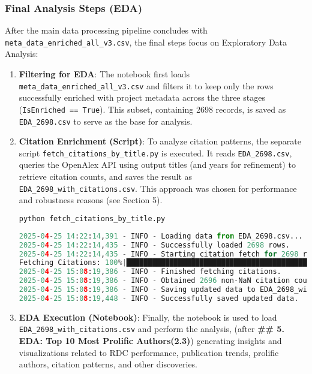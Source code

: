 \documentclass[12pt]{article}
\begin{document}
\subsubsection{Final Analysis Steps (EDA)}\label{final-analysis-steps-eda}

After the main data processing pipeline concludes with
\texttt{meta\_data\_enriched\_all\_v3.csv}, the final steps focus on
Exploratory Data Analysis:

\begin{enumerate}
\def\labelenumi{\arabic{enumi}.}
\item
  \textbf{Filtering for EDA}: The  notebook first
  loads \texttt{meta\_data\_enriched\_all\_v3.csv} and filters it to
  keep only the rows successfully enriched with project metadata across
  the three stages (\texttt{IsEnriched\ ==\ True}). This subset,
  containing 2698 records, is saved as \texttt{EDA\_2698.csv} to serve
  as the base for analysis.
\item
  \textbf{Citation Enrichment (Script)}: To analyze citation patterns,
  the separate script \texttt{fetch\_citations\_by\_title.py} is
  executed. It reads \texttt{EDA\_2698.csv}, queries the OpenAlex API
  using output titles (and years for refinement) to retrieve citation
  counts, and saves the result as
  \texttt{EDA\_2698\_with\_citations.csv}. This approach was chosen for
  performance and robustness reasons (see Section 5).

\begin{lstlisting}[language=Python]
python fetch_citations_by_title.py
\end{lstlisting}

\begin{lstlisting}[language=Python]
2025-04-25 14:22:14,391 - INFO - Loading data from EDA_2698.csv...
2025-04-25 14:22:14,435 - INFO - Successfully loaded 2698 rows.
2025-04-25 14:22:14,435 - INFO - Starting citation fetch for 2698 records using title search.
Fetching Citations: 100%|█████████████████████████████████████████████████████████████████████████████████████████████████████████████████████████| 2698/2698 [46:04<00:00,  1.02s/it]
2025-04-25 15:08:19,386 - INFO - Finished fetching citations.
2025-04-25 15:08:19,386 - INFO - Obtained 2696 non-NaN citation counts out of 2698 records.
2025-04-25 15:08:19,386 - INFO - Saving updated data to EDA_2698_with_citations.csv...
2025-04-25 15:08:19,448 - INFO - Successfully saved updated data.
\end{lstlisting}
\item
  \textbf{EDA Execution (Notebook)}: Finally, the 
  notebook is used to load \texttt{EDA\_2698\_with\_citations.csv} and
  perform the analysis, (after \textbf{\#\# 5. EDA: Top 10 Most Prolific
  Authors(2.3)}) generating insights and visualizations related to RDC
  performance, publication trends, prolific authors, citation patterns,
  and other discoveries.
\end{enumerate}
\end{document}
